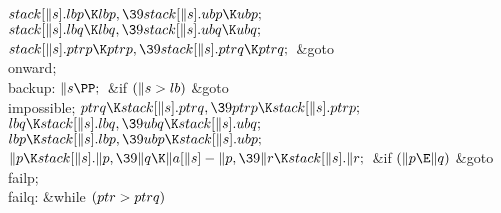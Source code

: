 ${}\\{stack}[\|s].\\{lbp}\K\\{lbp},\39\\{stack}[\|s].\\{ubp}\K\\{ubp};{}$\6
${}\\{stack}[\|s].\\{lbq}\K\\{lbq},\39\\{stack}[\|s].\\{ubq}\K\\{ubq};{}$\6
${}\\{stack}[\|s].\\{ptrp}\K\\{ptrp},\39\\{stack}[\|s].\\{ptrq}\K\\{ptrq};{}$\6
\&{goto} \\{onward};\6
\4\\{backup}:\5
${}\|s\PP;{}$\6
\&{if} ${}(\|s>\\{lb}){}$\1\5
\&{goto} \\{impossible};\2\6
${}\\{ptrq}\K\\{stack}[\|s].\\{ptrq},\39\\{ptrp}\K\\{stack}[\|s].\\{ptrp};{}$\6
${}\\{lbq}\K\\{stack}[\|s].\\{lbq},\39\\{ubq}\K\\{stack}[\|s].\\{ubq};{}$\6
${}\\{lbp}\K\\{stack}[\|s].\\{lbp},\39\\{ubp}\K\\{stack}[\|s].\\{ubp};{}$\6
${}\|p\K\\{stack}[\|s].\|p,\39\|q\K\|a[\|s]-\|p,\39\|r\K\\{stack}[\|s].\|r;{}$\6
\&{if} ${}(\|p\E\|q){}$\1\5
\&{goto} \\{failp};\2\6
\4\\{failq}:\5
\&{while} ${}(\\{ptr}>\\{ptrq}){}$\1\5
